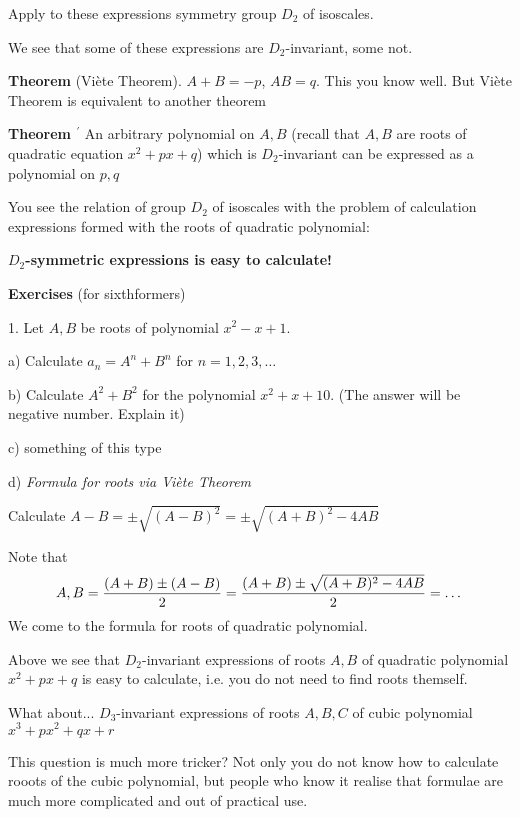   Apply to these expressions symmetry group $D_2$ of isoscales.

 We see that some of these expressions are  $D_2$-invariant, some not.

\smallskip

  {\bf Theorem } (Vi\`ete Theorem). $A+B=-p$, $AB=q$. This you know well. But Vi\`ete Theorem
  is  equivalent to another theorem

  \smallskip

  {\bf Theorem $^\prime$} An arbitrary polynomial on $A,B$ (recall that $A,B$ are roots of quadratic equation $x^2+px+q$)
      which is $D_2$-invariant can be expressed as a polynomial on $p,q$


You see the relation of group $D_2$ of isoscales with the problem of calculation expressions formed with the roots
of quadratic polynomial:

      \bigskip
\centerline {\bf
  $D_2$-symmetric expressions is easy to calculate!}


  {\bf Exercises} (for sixthformers)

    1. Let $A,B$ be roots of polynomial $x^2-x+1$.

    a) Calculate $a_n=A^n+B^n$ for $n=1,2,3,\dots$

     b) Calculate $A^2+B^2$ for the polynomial $x^2+x+10$.
     (The answer will be negative number. Explain it)

    c) something of this type


    d) {\it Formula for roots via Vi\`ete Theorem}

    Calculate $A-B=\pm \sqrt {(A-B)^2}=\pm \sqrt {(A+B)^2-4AB}$


    Note that $$
         A,B={(A+B)\pm (A-B)\over 2}={(A+B)\pm \sqrt {(A+B)^2-4AB}\over
         2}=\dots
            $$
We come to the formula for roots of quadratic polynomial.




\bigskip



 Above we see that $D_2$-invariant expressions of roots $A,B$ of quadratic polynomial $x^2+px+q$ is easy to calculate,
 i.e. you do not need to find roots themself.


   What about... $D_3$-invariant expressions of roots $A,B,C$ of cubic  polynomial $x^3+px^2+qx+r$


This question is much more tricker? Not only you do not know how to calculate rooots of the cubic polynomial,
but people who know it realise that formulae are much more complicated and out of practical use.

